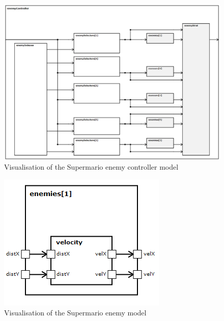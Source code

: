 \begin{figure}
	\centering
	\includegraphics[scale=0.4]{pictures/haller_enemycontroller.PNG}
	\caption{Visualisation of the Supermario enemy controller model}
	\label{fig:marioEnemyController}
\end{figure}

\begin{figure}
	\centering
	\includegraphics[scale=0.5]{pictures/haller_enemy.PNG}
	\caption{Visualisation of the Supermario enemy model}
	\label{fig:marioEnemy}
\end{figure}

